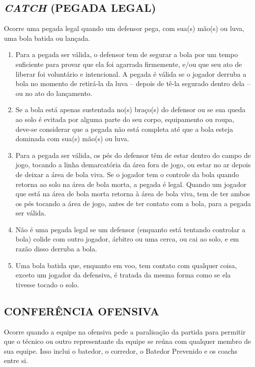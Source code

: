 \subsection{\textit{CATCH} (PEGADA LEGAL)}
Ocorre uma pegada legal quando um defensor pega, com sua(s) mão(s) ou luva, uma bola batida ou lançada.
\begin{enumerate}[label=(\alph*)]
	\item   Para a pegada ser válida, o defensor tem de segurar a bola por um tempo suficiente para provar que ela foi agarrada firmemente, e/ou que seu ato de liberar foi voluntário e intencional. A pegada é válida se o jogador derruba a bola  no momento de retirá-la da luva -- depois de tê-la segurado dentro dela -- ou no ato do lançamento.

	\item  Se a bola está apenas sustentada no(s) braço(s) do defensor ou se sua queda ao solo é evitada por alguma parte do seu corpo, equipamento ou roupa, deve-se considerar que a pegada não está completa até que a bola esteja dominada  com sua(s) mão(s) ou luva.
	\item  Para a pegada ser válida, os pés do defensor têm de estar dentro do campo de jogo, tocando a linha demarcatória da área fora de jogo, ou estar no ar depois de deixar a área de bola viva. Se o jogador tem o controle da bola quando retorna ao solo na área de bola morta, a pegada é legal. Quando um jogador que está	 na área de bola morta retorna à área de bola viva, tem de ter ambos os pés	 tocando a área de jogo, antes de ter contato com a bola, para a pegada ser	 válida.
	\item  Não é uma pegada legal se um defensor (enquanto está tentando controlar a bola) colide com outro jogador, árbitro ou uma cerca, ou cai ao solo, e em razão disso derruba a bola.
	\item  Uma bola batida que, enquanto em voo, tem contato com qualquer coisa, exceto um jogador da defensiva, é tratada da mesma forma como se ela tivesse tocado o solo.
\end{enumerate}
\subsection{CONFERÊNCIA OFENSIVA}
Ocorre quando a equipe na ofensiva pede a paralisação da partida para permitir que o técnico ou outro representante da equipe se reúna com qualquer membro de sua equipe. Isso inclui o batedor, o corredor, o Batedor Prevenido e os \glspl{coach} entre si.

